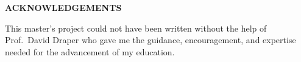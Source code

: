 \documentclass[12pt]{report}
\begin{document}
\setcounter{page}{2}

\newpage

\mbox{}

\newpage
\begin{center} \textbf{\large ACKNOWLEDGEMENTS} \end{center}
\bigskip
\noindent
This master's project could not have been written without the help of
Prof.~David Draper who gave me the guidance, encouragement, and expertise
needed for the advancement of my education.

\newpage

\singlespacing

\tableofcontents

\setcounter{tocdepth}{2}

\cleardoublepage
{}
\listoftables

\cleardoublepage
{}
\listoffigures

\newpage
\renewcommand{\nomname}{Notation}
\printnomenclature

\newpage
{}



\newpage
\printbibliography

\appendix

\end{document}
